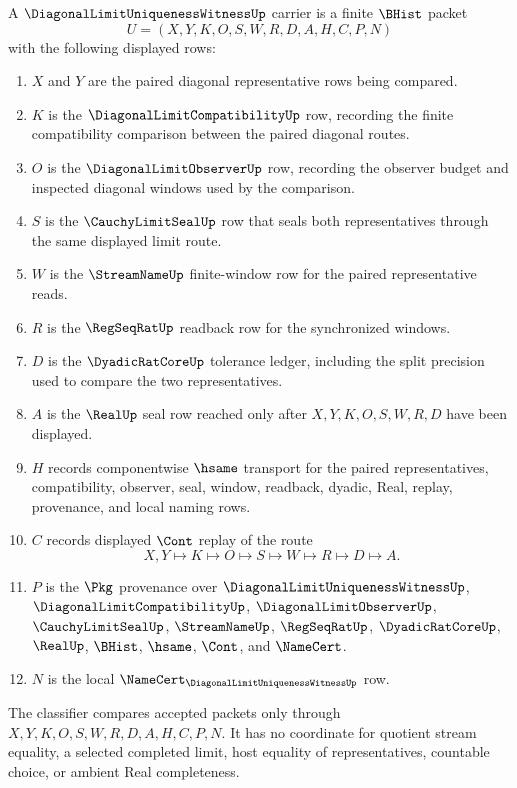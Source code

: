 \begin{definition}
\label{def:diagonal-limit-uniqueness-witness-carrier}
A $\DiagonalLimitUniquenessWitnessUp$ carrier is a finite $\BHist$ packet
$$
U=(X,Y,K,O,S,W,R,D,A,H,C,P,N)
$$
with the following displayed rows:
\begin{enumerate}
\item $X$ and $Y$ are the paired diagonal representative rows being compared.
\item $K$ is the $\DiagonalLimitCompatibilityUp$ row, recording the finite compatibility comparison between the paired diagonal routes.
\item $O$ is the $\DiagonalLimitObserverUp$ row, recording the observer budget and inspected diagonal windows used by the comparison.
\item $S$ is the $\CauchyLimitSealUp$ row that seals both representatives through the same displayed limit route.
\item $W$ is the $\StreamNameUp$ finite-window row for the paired representative reads.
\item $R$ is the $\RegSeqRatUp$ readback row for the synchronized windows.
\item $D$ is the $\DyadicRatCoreUp$ tolerance ledger, including the split precision used to compare the two representatives.
\item $A$ is the $\RealUp$ seal row reached only after $X,Y,K,O,S,W,R,D$ have been displayed.
\item $H$ records componentwise $\hsame$ transport for the paired representatives, compatibility, observer, seal, window, readback, dyadic, Real, replay, provenance, and local naming rows.
\item $C$ records displayed $\Cont$ replay of the route
$$
X,Y \longmapsto K \longmapsto O \longmapsto S \longmapsto W \longmapsto R \longmapsto D \longmapsto A .
$$
\item $P$ is the $\Pkg$ provenance over $\DiagonalLimitUniquenessWitnessUp$, $\DiagonalLimitCompatibilityUp$, $\DiagonalLimitObserverUp$, $\CauchyLimitSealUp$, $\StreamNameUp$, $\RegSeqRatUp$, $\DyadicRatCoreUp$, $\RealUp$, $\BHist$, $\hsame$, $\Cont$, and $\NameCert$.
\item $N$ is the local $\NameCert_{\DiagonalLimitUniquenessWitnessUp}$ row.
\end{enumerate}
The classifier compares accepted packets only through $X,Y,K,O,S,W,R,D,A,H,C,P,N$. It has no coordinate for quotient stream equality, a selected completed limit, host equality of representatives, countable choice, or ambient Real completeness.
\end{definition}

